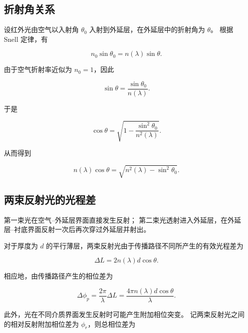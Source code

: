 \documentclass[UTF8,12pt,a4paper]{ctexart}
\begin{document}
\subsection{折射角关系}

设红外光由空气以入射角 $\theta_0$ 入射到外延层，在外延层中的折射角为 $\theta$。
根据 Snell 定律，有

\begin{equation}
    n_0\sin\theta_0=n(\lambda)\sin\theta.
\end{equation}

由于空气折射率近似为 $n_0=1$，因此

\begin{equation}
    \sin\theta
    =
    \frac{\sin\theta_0}{n(\lambda)}.
\end{equation}

于是

\begin{equation}
    \cos\theta
    =
    \sqrt{
    1-\frac{\sin^2\theta_0}{n^2(\lambda)}
    }.
\end{equation}

从而得到

\begin{equation}
    n(\lambda)\cos\theta
    =
    \sqrt{
    n^2(\lambda)-\sin^2\theta_0
    }.
    \label{eq:ncostheta}
\end{equation}

\subsection{两束反射光的光程差}

第一束光在空气--外延层界面直接发生反射；
第二束光透射进入外延层，在外延层--衬底界面反射一次后再次穿过外延层并射出。

对于厚度为 $d$ 的平行薄层，两束反射光由于传播路径不同所产生的有效光程差为

\begin{equation}
    \boxed{
    \Delta L
    =
    2n(\lambda)d\cos\theta
    }.
    \label{eq:optical_path_difference}
\end{equation}

相应地，由传播路径产生的相位差为

\begin{equation}
    \Delta\phi_p
    =
    \frac{2\pi}{\lambda}\Delta L
    =
    \frac{4\pi n(\lambda)d\cos\theta}{\lambda}.
    \label{eq:propagation_phase}
\end{equation}

此外，光在不同介质界面发生反射时可能产生附加相位突变。
记两束反射光之间的相对反射附加相位差为 $\phi_r$，则总相位差为
\end{document}
